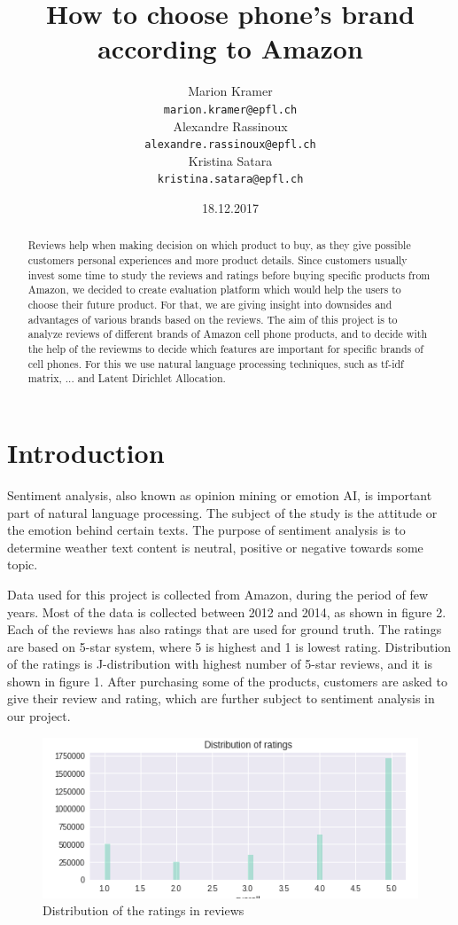 \documentclass[11pt]{article}
\title{How to choose phone's brand according to Amazon}
\author{Marion Kramer\\
  {\tt marion.kramer@epfl.ch} \\\And
  Alexandre Rassinoux \\
  {\tt alexandre.rassinoux@epfl.ch} \\\And
Kristina Satara \\
{\tt kristina.satara@epfl.ch} \\}
\date{18.12.2017}
\begin{document}
\maketitle
\begin{abstract}
Reviews help when making decision on which product to buy, as they give possible customers personal experiences and more product details. Since customers usually invest some time to study the reviews and ratings before buying specific products from Amazon, we decided to create evaluation platform which would help the users to choose their future product. For that, we are giving insight into  downsides and advantages of various brands based on the reviews. The aim of this project is to analyze reviews of different brands of Amazon cell phone products, and to decide with the help of the reviewms to decide which features are important for specific brands of cell phones. For this we use natural language processing techniques, such as tf-idf matrix, ...  and Latent Dirichlet Allocation.
\end{abstract}


\section{Introduction}
Sentiment analysis, also known as opinion mining or emotion AI, is important part of natural language processing. The subject of the study is the attitude or the emotion behind certain texts. The purpose of sentiment analysis is to determine weather text content is neutral, positive or negative towards some topic. 

Data used for this project is collected from Amazon, during the period of few years. Most of the data is collected between 2012 and 2014, as shown in figure 2. Each of the reviews has also ratings that are used for ground truth. The ratings are based on 5-star system, where 5 is highest and 1 is lowest rating. Distribution of the ratings is J-distribution with highest number of 5-star reviews, and it is shown in figure 1. After purchasing some of the products, customers are asked to give their review and rating, which are further subject to sentiment analysis in our project. 



\begin{figure}[h!]
  \centering
    \includegraphics[width=\linewidth]{ratingDistribution.png}
  \caption{Distribution of the ratings in reviews}
  \label{fig:ratingDistribution}
\end{figure}
\end{document}
